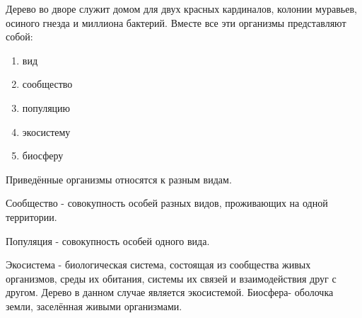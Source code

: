 
Дерево во дворе служит домом для двух красных кардиналов, колонии муравьев, осиного гнезда и миллиона бактерий. Вместе все эти организмы представляют собой:

\begin{enumerate}
    \item вид
    \item сообщество
    \item популяцию
    \item экосистему
    \item биосферу
\end{enumerate}

\explanationSection

Приведённые организмы относятся к разным видам. 

Сообщество - совокупность особей разных видов, проживающих на одной территории. 

Популяция - совокупность особей одного вида.

Экосистема - биологическая система, состоящая из сообщества живых организмов, среды их обитания, системы их связей и взаимодействия друг с другом. Дерево в данном случае является экосистемой. Биосфера- оболочка земли, заселённая живыми организмами.

